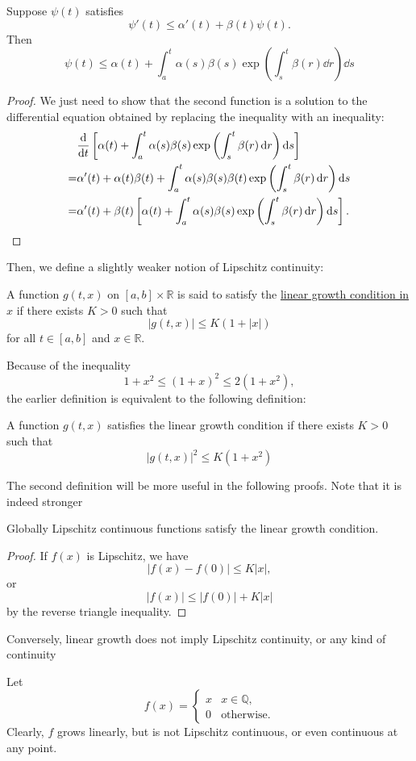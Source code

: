 \documentclass[prb,12pt]{revtex4-2}
\theoremstyle{definition}
\theoremstyle{definition}
\theoremstyle{definition}
\newcommand{\R}{\mathbb{R}}
\newcommand{\Q}{\mathbb{Q}}
\begin{document}
\begin{Corollary}
	Suppose $\psi(t)$ satisfies
	\[\psi'(t) \le \alpha'(t)+\beta(t)\psi(t).\]
	Then
	\[\psi(t)\le \alpha(t)+\int_a^t \alpha(s)\beta(s)\exp\left(\int_s^t \beta(r)\dd{r}\right)\dd{s}\]
\end{Corollary}
\begin{proof}
	We just need to show that the second function is a solution to the differential equation obtained by replacing the inequality with an inequality:
	\begin{align*}
		&\dv{t}\left[\alpha(t) + \int_a^t \alpha(s)\beta(s)\exp\left(\int_s^t \beta(r)\dd{r}\right)\dd{s}\right]\\
		=&\alpha'(t)+\alpha(t)\beta(t)+\int_a^t \alpha(s)\beta(s)\beta(t)\exp\left(\int_s^t \beta(r)\dd{r}\right)\dd{s}\\
		=&\alpha'(t)+\beta(t)\left[\alpha(t) + \int_a^t \alpha(s)\beta(s)\exp\left(\int_s^t \beta(r)\dd{r}\right)\dd{s}\right].\qedhere
	\end{align*}
\end{proof}
Then, we define a slightly weaker notion of Lipschitz continuity:
\begin{Definition}
	A function $g(t, x)$ on $[a,b]\times \R$ is said to satisfy the \uline{linear growth condition in $x$} if there exists $K>0$ such that
	\[|g(t, x)|\le K(1+|x|)\]
	for all $t\in [a,b]$ and $x\in \R$.
\end{Definition}
Because of the inequality
\[1+x^2 \le (1+x)^2 \le 2(1+x^2),\]
the earlier definition is equivalent to the following definition:
\begin{Proposition}
	A function $g(t,x)$ satisfies the linear growth condition if there exists $K>0$ such that
	\[|g(t,x)|^2 \le K(1+x^2)\]
\end{Proposition}
The second definition will be more useful in the following proofs. Note that it is indeed stronger
\begin{Proposition}
	Globally Lipschitz continuous functions satisfy the linear growth condition.
\end{Proposition}
\begin{proof}
If $f(x)$ is Lipschitz, we have
\[|f(x) - f(0)| \le K |x|,\]
or
\[|f(x)|\le |f(0)| + K|x|\]
by the reverse triangle inequality.
\end{proof}
Conversely, linear growth does not imply Lipschitz continuity, or any kind of continuity
\begin{Example}
	Let
	\[f(x) = \begin{cases}
		x & x\in \Q,\\
		0 & \text{otherwise}.
	\end{cases}\]
	Clearly, $f$ grows linearly, but is not Lipschitz continuous, or even continuous at any point.
\end{Example}
\end{document}
